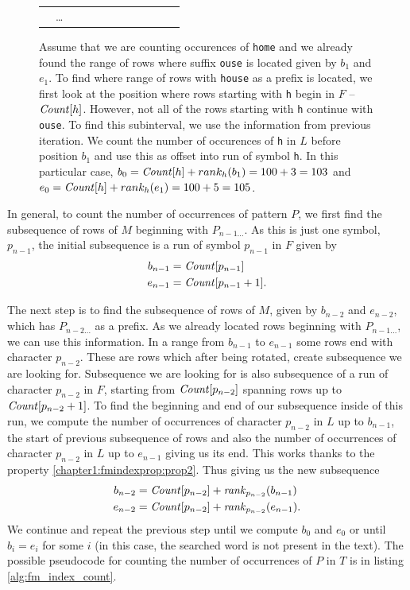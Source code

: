 \begin{figure}
{\begin{tabular}{c|c|l|l|l|l|l|l|l|l|l|l|}
	                & \ldots     &   &  &   &   &   &   &   &   &   &   \\ \cline{5-10}\cline{2-3}\cline{12-12}
	\end{tabular}
	}
	\caption[TODO]{Assume that we are counting occurences of \texttt{home} and we already found the
	range of rows where suffix \texttt{ouse} is located given by $b_1$ and $e_1$. To find where range
	of rows with \texttt{house} as a prefix is located, we first look at the position where rows starting with
	\texttt{h} begin in $F$ -- $\mathit{Count}[h]$. However, not all of the rows starting with \texttt{h} continue with
	\texttt{ouse}. To find this subinterval, we use the information from previous iteration. We count
	the number of occurences of \texttt{h} in $L$ before position $b_1$ and use this as offset into run of
	symbol \texttt{h}. In this particular case, $b_0 = \mathit{Count}[h] + rank_h(b_1) = 100 + 3 = 103$ and
	$e_0 = \mathit{Count}[h] + rank_h(e_1) = 100 + 5 = 105$.
	}
	\label{tab:fm_index_example}
\end{figure}

In general, to count the number of occurrences of pattern $P$, we first find the subsequence of rows of $M$
beginning with $P_{n-1\ldots}$. As this is just one symbol, $p_{n-1}$, the initial subsequence is a run
of symbol $p_{n-1}$ in $F$ given by
\begin{align*}
	b_{n-1}&=\mathit{Count}[p_{n-1}] \\
	e_{n-1}&=\mathit{Count}[p_{n-1}+1].\\
\end{align*}

The next step is to find the subsequence of rows of $M$, given by $b_{n-2}$ and $e_{n-2}$, which has
$P_{n-2\ldots}$ as a prefix. As we already located rows beginning with $P_{n-1\ldots}$, we can use
this information. In a range from $b_{n-1}$ to $e_{n-1}$ some rows end with character $p_{n-2}$. These
are rows which after being rotated, create subsequence we are looking for. Subsequence we are looking
for is also subsequence of a run of character $p_{n-2}$ in $F$, starting from $\mathit{Count}[p_{n-2}]$ spanning
rows up to $\mathit{Count}[p_{n-2}+1]$. To find the beginning and end of our subsequence inside of this run, we
compute the number of occurrences of character $p_{n-2}$ in $L$ up to $b_{n-1}$, the start of previous
subsequence of rows and also the number of occurrences of character $p_{n-2}$ in $L$ up to $e_{n-1}$
giving us its end. This works thanks to the property \ref{chapter1:fmindexprop:prop2}. Thus giving us the
new subsequence
\begin{align*}
	b_{n-2}&=\mathit{Count}[p_{n-2}] + \mathit{rank}_{p_{n-2}}(b_{n-1}) \\
	e_{n-2}&=\mathit{Count}[p_{n-2}] + \mathit{rank}_{p_{n-2}}(e_{n-1}).\\
\end{align*}
We continue and repeat the previous step until we compute $b_0$ and $e_0$ or until $b_i=e_i$ for some $i$
(in this case, the searched word is not present in the text). The possible pseudocode for counting the number
of occurrences of $P$ in $T$ is in listing \ref{alg:fm_index_count}.

